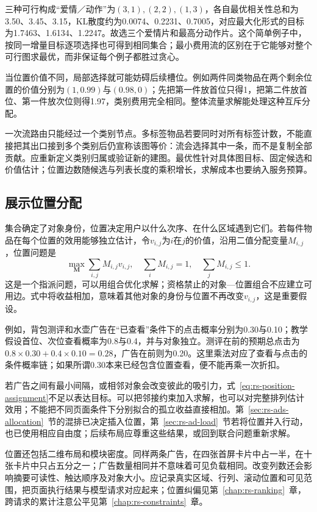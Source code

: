 三种可行构成“爱情／动作”为$(3,1),(2,2),(1,3)$，各自最优相关性总和为3.50、3.45、3.15，KL散度约为0.0074、0.2231、0.7005，对应最大化形式的目标为1.7463、1.6134、1.2247。故选三个爱情片和最高分动作片。这个简单例子中，按同一增量目标逐项选择也可得到相同集合；最小费用流的区别在于它能够对整个可行图求最优，而非保证每个例子都胜过贪心。

当位置价值不同，局部选择就可能妨碍后续槽位。例如两件同类物品在两个剩余位置的价值分别为$(1,0.99)$与$(0.98,0)$；先把第一件放首位只得1，把第二件放首位、第一件放次位则得1.97，类别费用完全相同。整体流量求解能处理这种互斥分配。

一次流路由只能经过一个类别节点。多标签物品若要同时对所有标签计数，不能直接把其出口接到多个类别后仍宣称该图等价：流会选择其中一条，而不是复制全部贡献。应重新定义类别归属或验证新的建图。最优性针对具体图目标、固定候选和价值估计；位置边数随候选与列表长度的乘积增长，求解成本也要纳入服务预算。

\subsection{展示位置分配}
\label{sec:rs-position-allocation}

集合确定了对象身份，位置决定用户以什么次序、在什么区域遇到它们。若每件物品在每个位置的效用能够独立估计，令$v_{i,j}$为$i$在$j$的价值，沿用二值分配变量$M_{i,j}$，位置问题是
\begin{equation}
 \max_{\bm M}\sum_{i,j}M_{i,j}v_{i,j},
 \quad
 \sum_iM_{i,j}=1,\quad
 \sum_jM_{i,j}\leq1.
 \label{eq:rs-position-assignment}
\end{equation}
这是一个指派问题，可以用组合优化求解；资格禁止的对象—位置组合不应建立可用边。式中将收益相加，意味着其他对象的身份与位置不再改变$v_{i,j}$，这是重要假设。

例如，背包测评和水壶广告在“已查看”条件下的点击概率分别为0.30与0.10；教学假设首位、次位查看概率为0.8与0.4，并与对象独立。测评在前的预期总点击为$0.8\times0.30+0.4\times0.10=0.28$，广告在前则为0.20。这里乘法对应了查看与点击的条件概率链；如果所谓0.30本来已经包含位置查看，便不能再乘一次折扣。

若广告之间有最小间隔，或相邻对象会改变彼此的吸引力，式~\eqref{eq:rs-position-assignment}不足以表达目标。可以把邻接约束加入求解，也可以对完整排列估计效用；不能把不同页面条件下分别拟合的孤立收益直接相加。第~\ref{sec:rs-ads-allocation}~节的混排已决定插入位置，第~\ref{sec:rs-ad-load}~节若将位置并入行动，也已使用相应自由度；后续布局应尊重这些结果，或回到联合问题重新求解。

位置还包括二维布局和模块密度。同样两条广告，在四张首屏卡片中占一半，在十张卡片中只占五分之一；广告数量相同并不意味着可见负载相同。改变列数还会影响摘要可读性、触达顺序及对象大小。应记录真实区域、行列、滚动位置和可见范围，把页面执行结果与模型请求对应起来；位置纠偏见第~\ref{chap:rs-ranking}~章，跨请求的累计注意公平见第~\ref{chap:rs-constraints}~章。

